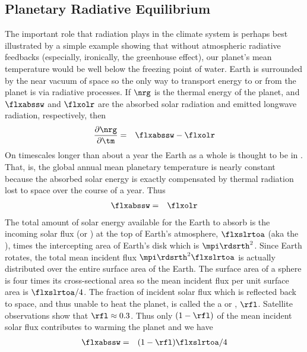 \documentclass[12pt]{article}
\begin{document}
\subsection{Planetary Radiative Equilibrium}\label{sxn:nrg_bln}
The important role that radiation plays in the climate system
is perhaps best illustrated by a simple example showing that
without atmospheric radiative feedbacks (especially, ironically, 
the greenhouse effect), our planet's mean temperature would be
well below the freezing point of water.
Earth is surrounded by the near vacuum of space so the only way to
transport energy to or from the planet is via radiative processes.
If $\nrg$ is the thermal energy of the planet, and $\flxabssw$ and
$\flxolr$ are the absorbed solar radiation and emitted longwave
radiation, respectively, then
\begin{eqnarray}
\frac{\partial \nrg}{\partial \tm} & = & \flxabssw - \flxolr
\label{eqn:nrg_bln_dfn}
\end{eqnarray}
On timescales longer than about a year the Earth as a whole is thought
to be in .
That, is, the global annual mean planetary temperature is nearly
constant because the absorbed solar energy is exactly compensated by
thermal radiation lost to space over the course of a year.
Thus
\begin{eqnarray}
\flxabssw & = & \flxolr
\label{eqn:rdn_eqm_dfn}
\end{eqnarray}
The total amount of solar energy available for the Earth to absorb is
the incoming solar flux (or ) at the top of Earth's
atmosphere, $\flxslrtoa$ (aka the ), times the
intercepting area of Earth's disk which is $\mpi \rdsrth^{2}$.
Since Earth rotates, the total mean incident flux $\mpi \rdsrth^{2}
\flxslrtoa$ is actually distributed over the entire surface area of the
Earth. 
The surface area of a sphere is four times its cross-sectional area
so the mean incident flux per unit surface area is $\flxslrtoa / 4$.
The fraction of incident solar flux which is reflected back to space,
and thus unable to heat the planet, is called the
a or , $\rfl$.
Satellite observations show that $\rfl \approx 0.3$.
Thus only $(1 - \rfl)$ of the mean incident solar flux contributes
to warming the planet and we have
\begin{eqnarray}
\flxabssw & = & (1 - \rfl) \flxslrtoa / 4
\label{eqn:flx_abs_sw_dfn}
\end{eqnarray}
\end{document}

